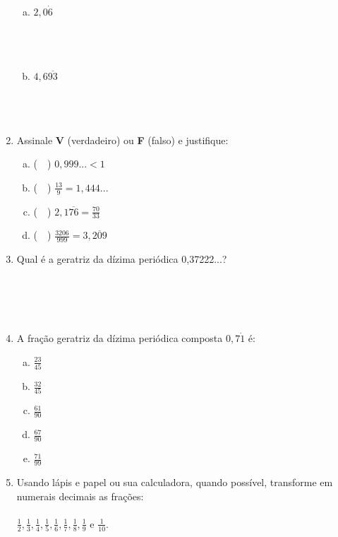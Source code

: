 \documentclass[a4paper,14pt]{article}
\begin{document}
\begin{multicols}{2}
\begin{enumerate}
\begin{enumerate}[a)]
				\item $2,0\dot{6}$ \\\\\\\\
				\item $4,6\overline{93}$ \\\\\\\\
			\end{enumerate}
			\item Assinale \textbf{V} (verdadeiro) ou \textbf{F} (falso) e justifique:
			\begin{enumerate}[a)]
				\item (~~) $0,999... < 1$
				\item (~~) $\frac{13}{9} = 1,444...$
				\item (~~) $2,1\overline{76} = \frac{70}{33}$
				\item (~~) $\frac{3206}{999} = 3,\overline{209}$
			\end{enumerate}
			\item Qual é a geratriz da dízima periódica 0,37222...? \\\\\\\\\\
			\item A fração geratriz da dízima periódica composta $0,7\dot{1}$ é:
			\begin{enumerate}[a)]
				\item $\frac{23}{45}$
				\item $\frac{32}{45}$
				\item $\frac{61}{90}$
				\item $\frac{67}{90}$
				\item $\frac{71}{99}$
			\end{enumerate}
			\item Usando lápis e papel ou sua calculadora, quando possível, transforme em numerais decimais as frações: \\\\
			$\frac{1}{2}, \frac{1}{3}, \frac{1}{4}, \frac{1}{5}, \frac{1}{6}, \frac{1}{7}, \frac{1}{8}, \frac{1}{9}$ e $\frac{1}{10}$.
		\end{enumerate}

\end{multicols}
\end{document}
